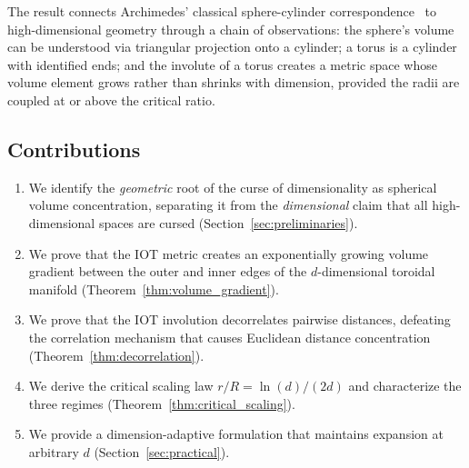 The result connects Archimedes' classical sphere-cylinder correspondence~\cite{archimedes_sphere} to high-dimensional geometry through a chain of observations: the sphere's volume can be understood via triangular projection onto a cylinder; a torus is a cylinder with identified ends; and the involute of a torus creates a metric space whose volume element grows rather than shrinks with dimension, provided the radii are coupled at or above the critical ratio.

\subsection{Contributions}

\begin{enumerate}
    \item We identify the \emph{geometric} root of the curse of dimensionality as spherical volume concentration, separating it from the \emph{dimensional} claim that all high-dimensional spaces are cursed (Section~\ref{sec:preliminaries}).
    \item We prove that the IOT metric creates an exponentially growing volume gradient between the outer and inner edges of the $d$-dimensional toroidal manifold (Theorem~\ref{thm:volume_gradient}).
    \item We prove that the IOT involution decorrelates pairwise distances, defeating the correlation mechanism that causes Euclidean distance concentration (Theorem~\ref{thm:decorrelation}).
    \item We derive the critical scaling law $r/R = \ln(d)/(2d)$ and characterize the three regimes (Theorem~\ref{thm:critical_scaling}).
    \item We provide a dimension-adaptive formulation that maintains expansion at arbitrary $d$ (Section~\ref{sec:practical}).
\end{enumerate}
